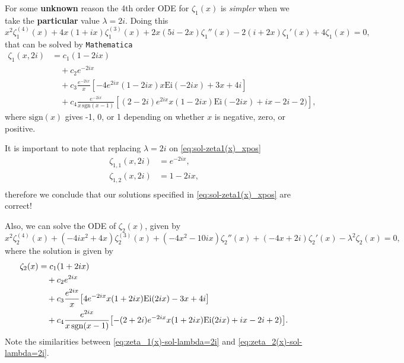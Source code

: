 \documentclass[%
 aip,
 jmp,%
 amsmath,amssymb,
 reprint,%
]{revtex4-2}
\begin{document}
For some \textbf{unknown} reason the 4th order ODE for $\zeta_1(x)$ is \textit{simpler} when we take the \textbf{particular} value $\lambda = 2i$. Doing this
\begin{equation}
x^2\zeta_1^{(4)}(x) + 4x(1+ ix)\zeta_1^{(3)}(x) + 2x (5i-2x)\zeta_1''(x) - 2(i+2x)\zeta_1'(x) + 4\zeta_1(x)=0,
\end{equation}
that can be solved by \texttt{Mathematica}
\begin{equation}\label{eq:zeta_1(x)-sol-lambda=2i}
\begin{aligned}
\zeta_1(x,2i) &= c_1(1 - 2ix)\\
&\quad + c_2 e^{-2 i x}\\
&\quad + c_3 \frac{e^{-2 i x}}{x} \left[-4 e^{2 i x} (1 - 2ix) x \text{Ei}(-2 i x) + 3x + 4i\right]\\
&\quad + c_4 \frac{e^{-2 i x}}{x \,  \text{sgn}(x-1)} \left[(2-2 i) e^{2 i x} x (1 - 2ix) \text{Ei}(-2 i x)+ix - 2i - 2)\right],
\end{aligned}
\end{equation}
where $\text{sign}(x)$ gives -1, 0, or 1 depending on whether $x$ is negative, zero, or positive.

It is important to note that replacing $\lambda = 2i$ on \eqref{eq:sol-zeta1(x)_xpos}
\begin{equation*}
\begin{aligned}
\zeta_{1,1}(x,2i) &= e^{-2ix},\\
\zeta_{1,2}(x,2i) &= 1-2ix,\\
\end{aligned}
\end{equation*}
therefore we conclude that our solutions specified in \eqref{eq:sol-zeta1(x)_xpos} are correct!

Also, we can solve the ODE of $\zeta_2(x)$, given by
\begin{equation}
x^2\zeta_2 ^{(4)}(x) +(-4ix^2+4x) \zeta_2 ^{(3)}(x)+ (-4x^2-10ix) \zeta_2 ''(x)+(-4 x+2 i) \zeta_2 '(x)-\lambda ^2 \zeta_2 (x)=0,
\end{equation}
where the solution is given by
\begin{equation}\label{eq:zeta_2(x)-sol-lambda=2i}
\begin{aligned}
\zeta_2(x) &= c_1(1 + 2ix)\\
&\quad + c_2e^{2ix}\\
&\quad + c_3\frac{e^{2 i x}}{x}\qty[4 e^{-2 i x}x (1+2 i x) \text{Ei}(2 i x) -3 x + 4 i ]\\
&\quad + c_4 \frac{e^{2 i x}}{x\, \text{sgn}(x-1)} \qty[-(2+2 i) e^{-2 i x} x (1 + 2ix) \text{Ei}(2 i x)+ ix - 2i + 2)].
\end{aligned}
\end{equation}
Note the similarities between \eqref{eq:zeta_1(x)-sol-lambda=2i} and \eqref{eq:zeta_2(x)-sol-lambda=2i}.
\end{document}
